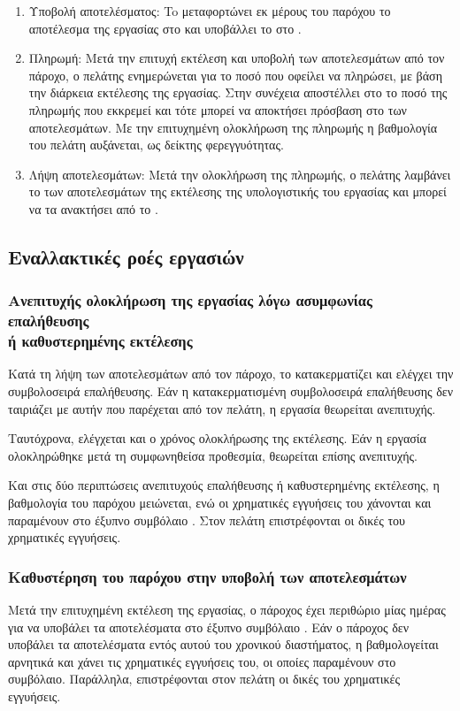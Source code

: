 \begin{enumerate}
    \item Υποβολή αποτελέσματος: To  μεταφορτώνει εκ μέρους του παρόχου το αποτέλεσμα της εργασίας στο  και υποβάλλει το  στο  \textit{}.
    \item Πληρωμή: Μετά την επιτυχή εκτέλεση και υποβολή των αποτελεσμάτων από τον πάροχο, ο πελάτης ενημερώνεται για το ποσό που οφείλει να πληρώσει, με βάση την διάρκεια εκτέλεσης της εργασίας. Στην συνέχεια αποστέλλει στο  \textit{} το ποσό της πληρωμής που εκκρεμεί και τότε μπορεί να αποκτήσει πρόσβαση στο  των αποτελεσμάτων. Με την επιτυχημένη ολοκλήρωση της πληρωμής η βαθμολογία του πελάτη αυξάνεται, ως δείκτης φερεγγυότητας.
    \item Λήψη αποτελεσμάτων: Μετά την ολοκλήρωση της πληρωμής, ο πελάτης λαμβάνει το  των αποτελεσμάτων της εκτέλεσης της υπολογιστικής του εργασίας και μπορεί να τα ανακτήσει από το .
\end{enumerate}

\subsection{Εναλλακτικές ροές εργασιών}
\subsubsection{Ανεπιτυχής ολοκλήρωση της εργασίας λόγω ασυμφωνίας επαλήθευσης \\ή καθυστερημένης εκτέλεσης}
Κατά τη λήψη των αποτελεσμάτων από τον πάροχο, το  κατακερματίζει και ελέγχει την συμβολοσειρά επαλήθευσης.
Εάν η κατακερματισμένη συμβολοσειρά επαλήθευσης δεν ταιριάζει με αυτήν που παρέχεται από τον πελάτη, η εργασία θεωρείται ανεπιτυχής.

Ταυτόχρονα, ελέγχεται και ο χρόνος ολοκλήρωσης της εκτέλεσης. Εάν η εργασία ολοκληρώθηκε μετά τη συμφωνηθείσα προθεσμία, θεωρείται επίσης ανεπιτυχής.

Και στις δύο περιπτώσεις ανεπιτυχούς επαλήθευσης ή καθυστερημένης εκτέλεσης, η βαθμολογία του παρόχου μειώνεται, ενώ οι χρηματικές εγγυήσεις του χάνονται και παραμένουν στο έξυπνο συμβόλαιο . Στον πελάτη επιστρέφονται οι δικές του χρηματικές εγγυήσεις.

\subsubsection{Καθυστέρηση του παρόχου στην υποβολή των αποτελεσμάτων}
Μετά την επιτυχημένη εκτέλεση της εργασίας, ο πάροχος έχει περιθώριο μίας ημέρας για να υποβάλει τα αποτελέσματα στο έξυπνο συμβόλαιο . Εάν ο πάροχος δεν υποβάλει τα αποτελέσματα εντός αυτού του χρονικού διαστήματος, η βαθμολογείται αρνητικά και χάνει τις χρηματικές εγγυήσεις του, οι οποίες παραμένουν στο συμβόλαιο. Παράλληλα, επιστρέφονται στον πελάτη οι δικές του χρηματικές εγγυήσεις.


